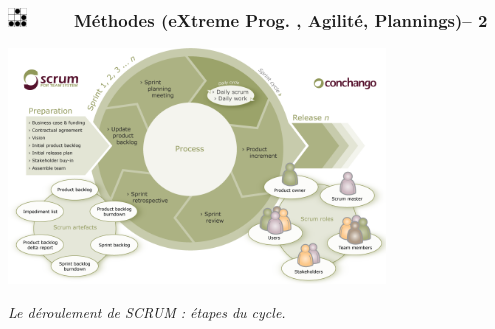 \documentclass[slidetop,11pt]{beamer}
\def\sectionPartIdDE{M{\'e}thodes (eXtreme Prog. , Agilit{\'e}, Plannings)}
\def\moreInFrameTitle{\includegraphics[height=0.5cm]{img/logo_glider.png}~~~~~}
\begin{document}
\begin{frame}
	\frametitle{\moreInFrameTitle \sectionPartIdDE -- 2}
		\includegraphics[width=10cm]{img/Scrum-Overview-Diagram.png}~\\
		\begin{center} \emph{Le d{\'e}roulement de SCRUM : {\'e}tapes du cycle. } \end{center}
\end{frame}
\end{document}
